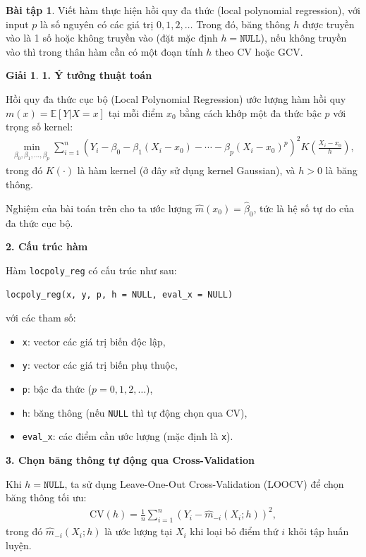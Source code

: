 \documentclass[12pt,xcolor=dvipsnames]{article}
\date{}
\theoremstyle{definition}
\newtheorem*{giai}{Giải}
\newtheorem{bt}{Bài tập}
\begin{document}
\begin{bt}
Viết hàm thực hiện hồi quy đa thức (local polynomial regression), với input $p$ là số nguyên có các giá trị $0, 1, 2, \ldots$ Trong đó, băng thông $h$ được truyền vào là 1 số hoặc không truyền vào (đặt mặc định $h = \texttt{NULL}$), nếu không truyền vào thì trong thân hàm cần có một đoạn tính $h$ theo CV hoặc GCV.
\end{bt}

\begin{giai}
\textbf{1. Ý tưởng thuật toán}

Hồi quy đa thức cục bộ (Local Polynomial Regression) ước lượng hàm hồi quy $m(x) = \mathbb{E}[Y|X=x]$ tại mỗi điểm $x_0$ bằng cách khớp một đa thức bậc $p$ với trọng số kernel:
\begin{align}
\min_{\beta_0,\beta_1,\ldots,\beta_p} \sum_{i=1}^n \left(Y_i - \beta_0 - \beta_1(X_i-x_0) - \cdots - \beta_p(X_i-x_0)^p\right)^2 K\left(\frac{X_i-x_0}{h}\right),
\end{align}
trong đó $K(\cdot)$ là hàm kernel (ở đây sử dụng kernel Gaussian), và $h>0$ là băng thông.

Nghiệm của bài toán trên cho ta ước lượng $\hat{m}(x_0) = \hat{\beta}_0$, tức là hệ số tự do của đa thức cục bộ.

\textbf{2. Cấu trúc hàm} 

Hàm \texttt{locpoly\_reg} có cấu trúc như sau:
\begin{verbatim}
locpoly_reg(x, y, p, h = NULL, eval_x = NULL)
\end{verbatim}
với các tham số:
\begin{itemize}
    \item \texttt{x}: vector các giá trị biến độc lập,
    \item \texttt{y}: vector các giá trị biến phụ thuộc,
    \item \texttt{p}: bậc đa thức ($p=0,1,2,\ldots$),
    \item \texttt{h}: băng thông (nếu \texttt{NULL} thì tự động chọn qua CV),
    \item \texttt{eval\_x}: các điểm cần ước lượng (mặc định là \texttt{x}).
\end{itemize}

\textbf{3. Chọn băng thông tự động qua Cross-Validation}

Khi $h=\texttt{NULL}$, ta sử dụng Leave-One-Out Cross-Validation (LOOCV) để chọn băng thông tối ưu:
\begin{align}
\text{CV}(h) = \frac{1}{n}\sum_{i=1}^n \left(Y_i - \hat{m}_{-i}(X_i;h)\right)^2,
\end{align}
trong đó $\hat{m}_{-i}(X_i;h)$ là ước lượng tại $X_i$ khi loại bỏ điểm thứ $i$ khỏi tập huấn luyện.


\end{giai}
\end{document}
